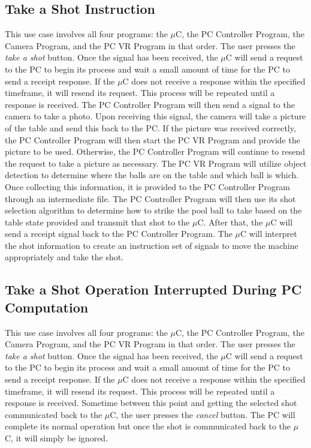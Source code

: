 \documentclass[titlepage]{article}
\begin{document}
\subsection{Take a Shot Instruction}
This use case involves all four programs: the $\mu$C, the PC Controller Program, the Camera Program, and the PC VR Program in that order. The user presses the \textit{take a shot} button. Once the signal has been received, the $\mu$C will send a request to the PC to begin its process and wait a small amount of time for the PC to send a receipt response. If the $\mu$C does not receive a response within the specified timeframe, it will resend its request. This process will be repeated until a response is received. The PC Controller Program will then send a signal to the camera to take a photo. Upon receiving this signal, the camera will take a picture of the table and send this back to the PC. If the picture was received correctly, the PC Controller Program will then start the PC VR Program and provide the picture to be used. Otherwise, the PC Controller Program will continue to resend the request to take a picture as necessary. The PC VR Program will utilize object detection to determine where the balls are on the table and which ball is which. Once collecting this information, it is provided to the PC Controller Program through an intermediate file. The PC Controller Program will then use its shot selection algorithm to determine how to strike the pool ball to take based on the table state provided and transmit that shot to the $\mu$C. After that, the $\mu$C will send a receipt signal back to the PC Controller Program. The $\mu$C will interpret the shot information to create an instruction set of signals to move the machine appropriately and take the shot.
\subsection{Take a Shot Operation Interrupted During PC Computation}
This use case involves all four programs: the $\mu$C, the PC Controller Program, the Camera Program, and the PC VR Program in that order. The user presses the \textit{take a shot} button. Once the signal has been received, the $\mu$C will send a request to the PC to begin its process and wait a small amount of time for the PC to send a receipt response. If the $\mu$C does not receive a response within the specified timeframe, it will resend its request. This process will be repeated until a response is received. Sometime between this point and getting the selected shot communicated back to the $\mu$C, the user presses the \textit{cancel} button. The PC will complete its normal operation but once the shot is communicated back to the $\mu$C, it will simply be ignored.
\end{document}
